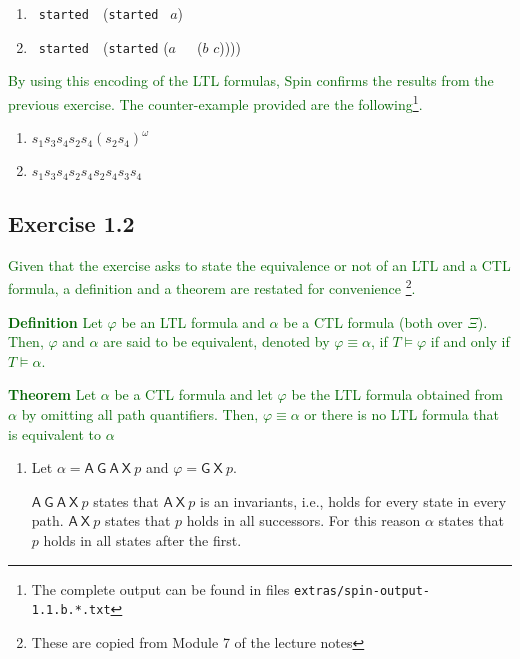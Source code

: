 \documentclass[12pt]{article}
\newcommand{\drafter}[1]{\textcolor{darkgreen}{#1}}
\begin{document}
\begin{enumerate}[label=\roman*.]
\begin{enumerate}[label=\roman*.]
  \item {\neg~\texttt{started}~~(\texttt{started} \wedge \square~$a$)}

  \item {\neg~\texttt{started}~~(\texttt{started} \wedge ($a$~~\square~($b$ \vee $c$))))}

\end{enumerate}

\drafter{By using this encoding of the LTL formulas, Spin confirms the results from the previous exercise.}
\drafter{The counter-example provided are the following\footnote{The complete output can be found in files \texttt{extras/spin-output-1.1.b.*.txt}}.}

\begin{enumerate}[label=\roman*.]
  \item $s_1 s_3 s_4 s_2 s_4 (s_2 s_4)^\omega$
  \addtocounter{enumi}{2}
  \item $s_1 s_3 s_4 s_2 s_4 s_2 s_4 s_3 s_4$
\end{enumerate}

\subsection*{Exercise 1.2}

\drafter{Given that the exercise asks to state the equivalence or not of an LTL and a CTL formula, a definition and a theorem are restated for convenience \footnote{These are copied from Module 7 of the lecture notes}.}

\drafter{\textbf{Definition} Let $\varphi$ be an LTL formula and $\alpha$ be a CTL formula (both over $\Xi$). Then, $\varphi$ and $\alpha$ are said to be equivalent, denoted by $\varphi \equiv \alpha$, if $T \models \varphi$ if and only if $T \models \alpha$.}

\drafter{\textbf{Theorem} Let $\alpha$ be a CTL formula and let $\varphi$ be the LTL formula obtained from $\alpha$ by omitting all path quantifiers. Then, $\varphi \equiv \alpha$ or there is no LTL formula that is equivalent to $\alpha$}

\begin{enumerate}[label=(\alph*)]
  \item Let $\alpha = \mathsf{A}~\mathsf{G}~\mathsf{A}~\mathsf{X}~p$ and $\varphi = \mathsf{G}~\mathsf{X}~p$.

    $\mathsf{A}~\mathsf{G}~\mathsf{A}~\mathsf{X}~p$ states that $\mathsf{A}~\mathsf{X}~p$ is an invariants, i.e., holds for every state in every path.
    $\mathsf{A}~\mathsf{X}~p$ states that $p$ holds in all successors.
    For this reason $\alpha$ states that $p$ holds in all states after the first.


\end{enumerate}
\end{enumerate}
\end{document}
